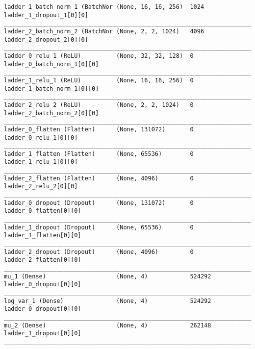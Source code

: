 \begin{lstlisting}[caption={dSprites-VLAE Encoder},captionpos=b,basicstyle=\tiny, label={lst:dsprites-vlae-encoder}]
ladder_1_batch_norm_1 (BatchNor (None, 16, 16, 256)  1024        ladder_1_dropout_1[0][0]
__________________________________________________________________________________________________
ladder_2_batch_norm_2 (BatchNor (None, 2, 2, 1024)   4096        ladder_2_dropout_2[0][0]
__________________________________________________________________________________________________
ladder_0_relu_1 (ReLU)          (None, 32, 32, 128)  0           ladder_0_batch_norm_1[0][0]
__________________________________________________________________________________________________
ladder_1_relu_1 (ReLU)          (None, 16, 16, 256)  0           ladder_1_batch_norm_1[0][0]
__________________________________________________________________________________________________
ladder_2_relu_2 (ReLU)          (None, 2, 2, 1024)   0           ladder_2_batch_norm_2[0][0]
__________________________________________________________________________________________________
ladder_0_flatten (Flatten)      (None, 131072)       0           ladder_0_relu_1[0][0]
__________________________________________________________________________________________________
ladder_1_flatten (Flatten)      (None, 65536)        0           ladder_1_relu_1[0][0]
__________________________________________________________________________________________________
ladder_2_flatten (Flatten)      (None, 4096)         0           ladder_2_relu_2[0][0]
__________________________________________________________________________________________________
ladder_0_dropout (Dropout)      (None, 131072)       0           ladder_0_flatten[0][0]
__________________________________________________________________________________________________
ladder_1_dropout (Dropout)      (None, 65536)        0           ladder_1_flatten[0][0]
__________________________________________________________________________________________________
ladder_2_dropout (Dropout)      (None, 4096)         0           ladder_2_flatten[0][0]
__________________________________________________________________________________________________
mu_1 (Dense)                    (None, 4)            524292      ladder_0_dropout[0][0]
__________________________________________________________________________________________________
log_var_1 (Dense)               (None, 4)            524292      ladder_0_dropout[0][0]
__________________________________________________________________________________________________
mu_2 (Dense)                    (None, 4)            262148      ladder_1_dropout[0][0]
__________________________________________________________________________________________________

\end{lstlisting}
